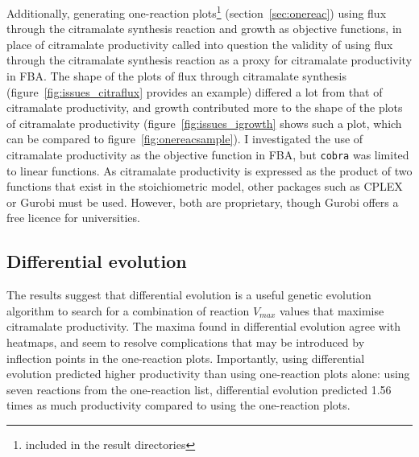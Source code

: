 \documentclass[parskip=full, numbers=noenddot]{scrreprt}
\begin{document}
Additionally, generating one-reaction plots\footnote{included in the result directories} (section~\ref{sec:onereac}) using flux through the citramalate synthesis reaction and growth as objective functions, in place of citramalate productivity called into question the validity of using flux through the citramalate synthesis reaction as a proxy for citramalate productivity in FBA. The shape of the plots of flux through citramalate synthesis (figure~\vref{fig:issues_citraflux} provides an example) differed a lot from that of citramalate productivity, and growth contributed more to the shape of the plots of citramalate productivity (figure~\vref{fig:issues_igrowth} shows such a plot, which can be compared to figure~\vref{fig:onereacsample}). I investigated the use of citramalate productivity as the objective function in FBA, but \texttt{cobra} was limited to linear functions. As citramalate productivity is expressed as the product of two functions that exist in the stoichiometric model, other packages such as CPLEX or Gurobi must be used. However, both are proprietary, though Gurobi offers a free licence for universities.


\subsection{Differential evolution}
\label{ssec:discussion-kinetic-de}

The results suggest that differential evolution is a useful genetic evolution algorithm to search for a combination of reaction $V_{max}$ values that maximise citramalate productivity. The maxima found in differential evolution agree with heatmaps, and seem to resolve complications that may be introduced by inflection points in the one-reaction plots. Importantly, using differential evolution predicted higher productivity than using one-reaction plots alone: using seven reactions from the one-reaction list, differential evolution predicted 1.56 times as much productivity compared to using the one-reaction plots.
\end{document}
